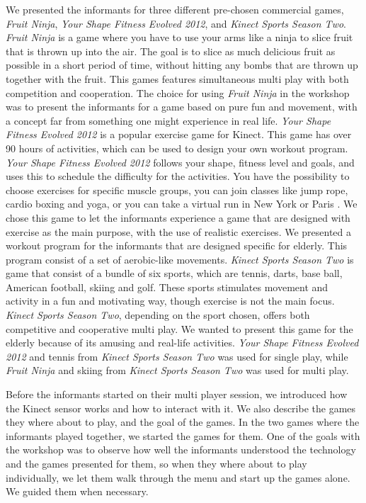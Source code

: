 We presented the informants for three different pre-chosen commercial games, \emph{Fruit Ninja}, \emph{Your Shape Fitness Evolved 2012}, and \emph{Kinect Sports Season Two}. \emph{Fruit Ninja} is a game where you have to use your arms like a ninja to slice fruit that is thrown up into the air. The goal is to slice as much delicious fruit as possible in a short period of time, without hitting any bombs that are thrown up together with the fruit. This games features simultaneous multi play with both competition and cooperation. The choice for using \emph{Fruit Ninja} in the workshop was to present the informants for a game based on pure fun and movement, with a concept far from something one might experience in real life. \emph{Your Shape Fitness Evolved 2012} is a popular exercise game for Kinect. This game has over 90 hours of activities, which can be used to design your own workout program. \emph{Your Shape Fitness Evolved 2012} follows your shape, fitness level and goals, and uses this to schedule the difficulty for the activities. You have the possibility to choose exercises for specific muscle groups, you can join classes like jump rope, cardio boxing and yoga, or you can take a virtual run in New York or Paris \cite{yourshape}. We chose this game to let the informants experience a game that are designed with exercise as the main purpose, with the use of realistic exercises. We presented a workout program for the informants that are designed specific for elderly. This program consist of a set of aerobic-like movements. \emph{Kinect Sports Season Two} is game that consist of a bundle of six sports, which are tennis, darts, base ball, American football, skiing and golf. These sports stimulates movement and activity in a fun and motivating way, though exercise is not the main focus. \emph{Kinect Sports Season Two}, depending on the sport chosen, offers both competitive and cooperative multi play. We wanted to present this game for the elderly because of its amusing and real-life activities. \emph{Your Shape Fitness Evolved 2012} and tennis from \emph{Kinect Sports Season Two} was used for single play, while \emph{Fruit Ninja} and skiing from \emph{Kinect Sports Season Two} was used for multi play. 

Before the informants started on their multi player session, we introduced how the Kinect sensor works and how to interact with it. We also describe the games they where about to play, and the goal of the games. In the two games where the informants played together, we started the games for them. One of the goals with the workshop was to observe how well the informants understood the technology and the games presented for them, so when they where about to play individually, we let them walk through the menu and start up the games alone. We guided them when necessary. 

